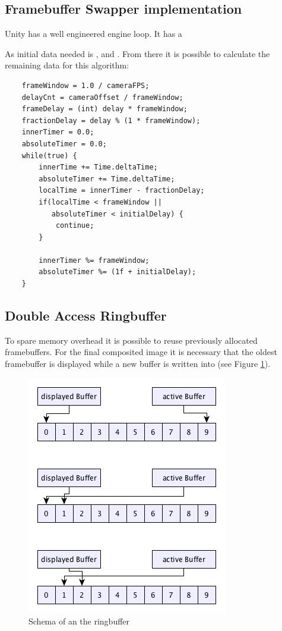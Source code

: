 \subsection{Framebuffer Swapper implementation}

Unity has a well engineered engine loop. It has a

As initial data needed is ,  and 
. From there it is possible to calculate the remaining 
data for this algorithm:

\begin{lstlisting}
	frameWindow = 1.0 / cameraFPS;
	delayCnt = cameraOffset / frameWindow;
	frameDelay = (int) delay * frameWindow;
	fractionDelay = delay % (1 * frameWindow);
	innerTimer = 0.0;
	absoluteTimer = 0.0;
	while(true) {
		innerTime += Time.deltaTime;
		absoluteTimer += Time.deltaTime;
		localTime = innerTimer - fractionDelay;
		if(localTime < frameWindow ||
		   absoluteTimer < initialDelay) {
			continue;
		}
		
		innerTimer %= frameWindow;
		absoluteTimer %= (1f + initialDelay);
	}
\end{lstlisting}


\subsection{Double Access Ringbuffer}

To spare memory overhead it is possible to reuse previously allocated 
framebuffers. For the final composited image it is necessary that the oldest 
framebuffer is displayed while a new buffer is written into (see Figure 
\ref{fig:offsets:ringbuffer}).

\begin{figure}[htb]
	\centering
	\includegraphics[width=.5\textwidth]{gfx/ringbuffer_schematics.png}
	\caption{Schema of an the ringbuffer}
	\label{fig:offsets:ringbuffer}
\end{figure}


